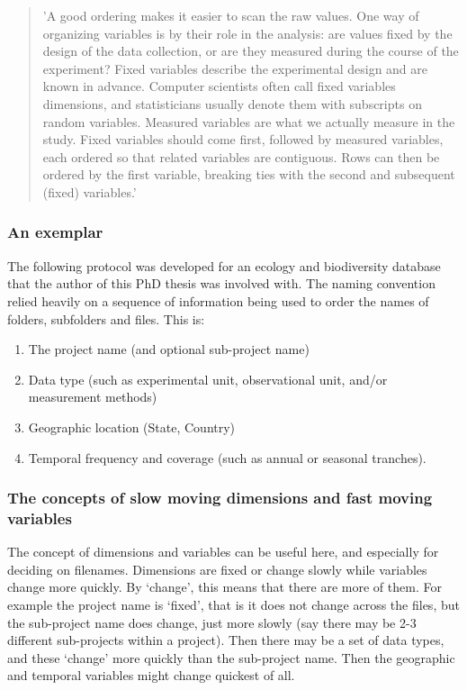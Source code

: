 \documentclass[11pt,a4paper]{article}
\begin{document}
\begin{quote}
'A good ordering makes it easier to scan the raw values. One way of
organizing variables is by their role in the analysis: are values
fixed by the design of the data collection, or are they measured
during the course of the experiment? Fixed variables describe the
experimental design and are known in advance. Computer scientists
often call fixed variables dimensions, and statisticians usually
denote them with subscripts on random variables. Measured variables
are what we actually measure in the study. Fixed variables should come
first, followed by measured variables, each ordered so that related
variables are contiguous. Rows can then be ordered by the first
variable, breaking ties with the second and subsequent (fixed)
variables.'
\end{quote}

\subsubsection{An exemplar}\label{an-exemplar}

The following protocol was developed for an ecology and biodiversity
database that the author of this PhD thesis was involved with. The
naming convention relied heavily on a sequence of information being used
to order the names of folders, subfolders and files. This is:

\begin{enumerate}
\def\labelenumi{\arabic{enumi}.}
\itemsep1pt\parskip0pt
\item
  The project name (and optional sub-project name)
\item
  Data type (such as experimental unit, observational unit, and/or
  measurement methods)
\item
  Geographic location (State, Country)
\item
  Temporal frequency and coverage (such as annual or seasonal tranches).
\end{enumerate}

\subsubsection{The concepts of slow moving dimensions and fast moving
variables}\label{the-concepts-of-slow-moving-dimensions-and-fast-moving-variables}

The concept of dimensions and variables can be useful here, and
especially for deciding on filenames. Dimensions are fixed or change
slowly while variables change more quickly. By `change', this means that
there are more of them. For example the project name is `fixed', that is
it does not change across the files, but the sub-project name does
change, just more slowly (say there may be 2-3 different sub-projects
within a project). Then there may be a set of data types, and these
`change' more quickly than the sub-project name. Then the geographic and
temporal variables might change quickest of all.
\end{document}
